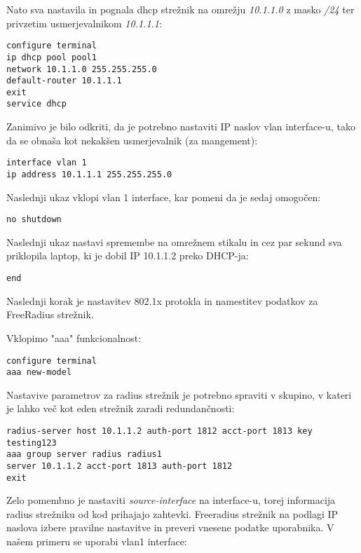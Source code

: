 \documentclass[12pt]{article}
\begin{document}
Nato sva nastavila in pognala dhcp strežnik na omrežju \emph{10.1.1.0} z masko \emph{/24} ter privzetim usmerjevalnikom \emph{10.1.1.1}:

\begin{verbatim}
configure terminal
ip dhcp pool pool1
network 10.1.1.0 255.255.255.0
default-router 10.1.1.1
exit
service dhcp
\end{verbatim}

Zanimivo je bilo odkriti, da je potrebno nastaviti IP naslov vlan interface-u, tako da se obnaša kot nekakšen usmerjevalnik (za mangement):

\begin{verbatim}
interface vlan 1
ip address 10.1.1.1 255.255.255.0
\end{verbatim}

Naslednji ukaz vklopi vlan 1 interface, kar pomeni da je sedaj omogočen:

\begin{verbatim}
no shutdown
\end{verbatim}

Naslednji ukaz nastavi spremembe na omrežnem stikalu in cez par sekund sva priklopila laptop, ki je dobil IP 10.1.1.2 preko DHCP-ja:

\begin{verbatim}
end
\end{verbatim}

Naslednji korak je nastavitev 802.1x protokla in namestitev podatkov za FreeRadius strežnik.

Vklopimo "aaa" funkcionalnost:

\begin{verbatim}
configure terminal
aaa new-model
\end{verbatim}

Nastavive parametrov za radius strežnik je potrebno spraviti v skupino, v kateri je lahko več kot eden strežnik zaradi redundančnosti:

\begin{verbatim}
radius-server host 10.1.1.2 auth-port 1812 acct-port 1813 key testing123
aaa group server radius radius1
server 10.1.1.2 acct-port 1813 auth-port 1812
exit
\end{verbatim}

Zelo pomembno je nastaviti \emph{source-interface} na interface-u, torej informacija radius strežniku od kod prihajajo zahtevki. Freeradius strežnik na podlagi IP naslova izbere pravilne nastavitve in preveri vnesene podatke uporabnika. V našem primeru se uporabi vlan1 interface:
\end{document}
